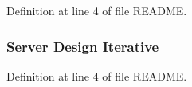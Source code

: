 Definition at line 4 of file R\-E\-A\-D\-M\-E.

\hypertarget{tcpSocket_2README_a3652bdf2b1d82505530a3f0fae48505c}{
\subsubsection[{Iterative}]{\setlength{\rightskip}{0pt plus 5cm}Server Design Iterative}}\label{tcpSocket_2README_a3652bdf2b1d82505530a3f0fae48505c}


Definition at line 4 of file R\-E\-A\-D\-M\-E.

